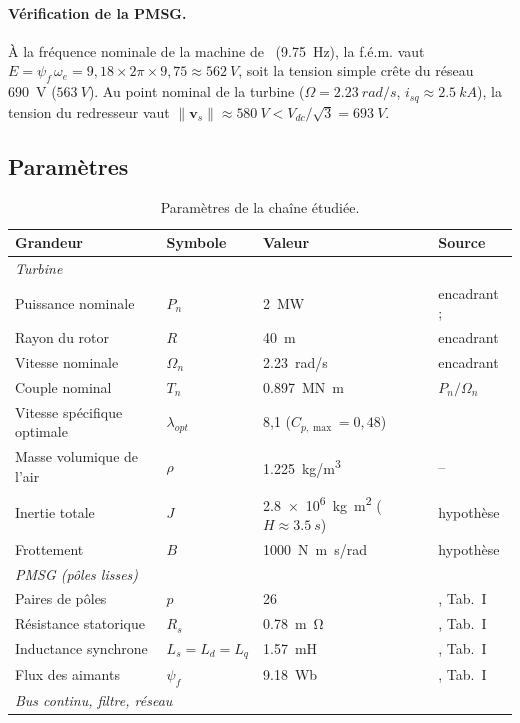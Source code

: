 \documentclass[11pt,a4paper]{article}
\theoremstyle{remark}
\newcommand{\vect}[1]{\bm{#1}}
\begin{document}
\paragraph{Vérification de la PMSG.} À la fréquence nominale de la machine de~\cite{hasan}
(\SI{9,75}{Hz}), la f.é.m. vaut $E=\psi_f\,\omega_e = 9{,}18\times 2\pi\times 9{,}75\approx\SI{562}{V}$,
soit la tension simple crête du réseau \SI{690}{V} ($\SI{563}{V}$). Au point nominal de la turbine
($\Omega=\SI{2,23}{rad/s}$, $i_{sq}\approx\SI{2,5}{kA}$), la tension du redresseur vaut
$\|\vect{v}_s\|\approx\SI{580}{V} < V_{dc}/\sqrt3 = \SI{693}{V}$.

\subsection{Paramètres}
\begin{table}[h]
\centering
\caption{Paramètres de la chaîne étudiée.}
\label{tab:param}
\begin{tabular}{llll}
\toprule
Grandeur & Symbole & Valeur & Source\\
\midrule
\multicolumn{4}{l}{\emph{Turbine}}\\
Puissance nominale & $P_n$ & \SI{2}{MW} & encadrant ; \cite{hasan}\\
Rayon du rotor & $R$ & \SI{40}{m} & encadrant\\
Vitesse nominale & $\Omega_n$ & \SI{2,23}{rad/s} & encadrant\\
Couple nominal & $T_n$ & \SI{0,897}{MN.m} & $P_n/\Omega_n$\\
Vitesse spécifique optimale & $\lambda_{opt}$ & 8,1 ($C_{p,\max}=0{,}48$) & \cite{hasan}\\
Masse volumique de l'air & $\rho$ & \SI{1,225}{kg/m^3} & --\\
Inertie totale & $J$ & \SI{2,8e6}{kg.m^2} ($H\approx\SI{3,5}{s}$) & hypothèse\\
Frottement & $B$ & \SI{1000}{N.m.s/rad} & hypothèse\\
\midrule
\multicolumn{4}{l}{\emph{PMSG (pôles lisses)}}\\
Paires de pôles & $p$ & 26 & \cite{hasan}, Tab.~I\\
Résistance statorique & $R_s$ & \SI{0,78}{m\ohm} & \cite{hasan}, Tab.~I\\
Inductance synchrone & $L_s=L_d=L_q$ & \SI{1,57}{mH} & \cite{hasan}, Tab.~I\\
Flux des aimants & $\psi_f$ & \SI{9,18}{Wb} & \cite{hasan}, Tab.~I\\
\midrule
\multicolumn{4}{l}{\emph{Bus continu, filtre, réseau}}\\

\end{tabular}
\end{table}
\end{document}
